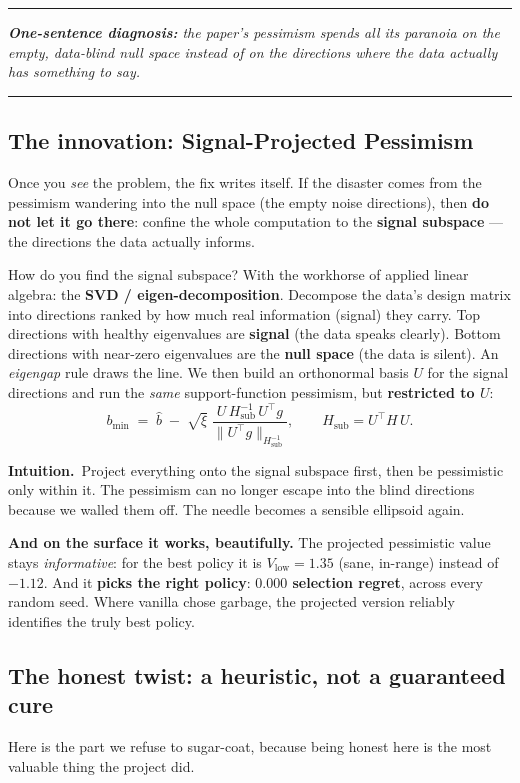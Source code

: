 \documentclass[11pt]{article}
\newenvironment{takeaway}
  {\par\vspace{4pt}\noindent\begin{center}\begin{minipage}{0.94\linewidth}%
   \color{black!88}\rule{\linewidth}{0.7pt}\par\vspace{3pt}\small\itshape}
  {\par\vspace{3pt}\rule{\linewidth}{0.7pt}\end{minipage}\end{center}\vspace{4pt}}
\newcommand{\intuition}[1]{\vspace{2pt}\noindent\textbf{Intuition.}\ #1\par\vspace{2pt}}
\begin{document}
\begin{takeaway}
\textbf{One-sentence diagnosis:} the paper's pessimism spends all its paranoia on the
empty, data-blind \emph{null space} instead of on the directions where the data
actually has something to say.
\end{takeaway}

\subsection{The innovation: Signal-Projected Pessimism}
Once you \emph{see} the problem, the fix writes itself. If the disaster comes from the
pessimism wandering into the null space (the empty noise directions), then
\textbf{do not let it go there}: confine the whole computation to the \textbf{signal
subspace} --- the directions the data actually informs.

How do you find the signal subspace? With the workhorse of applied linear algebra:
the \textbf{SVD / eigen-decomposition}. Decompose the data's design matrix into
directions ranked by how much real information (signal) they carry. Top directions
with healthy eigenvalues are \textbf{signal} (the data speaks clearly). Bottom
directions with near-zero eigenvalues are the \textbf{null space} (the data is
silent). An \emph{eigengap} rule draws the line. We then build an orthonormal basis
$U$ for the signal directions and run the \emph{same} support-function pessimism, but
\textbf{restricted to $U$}:
\begin{equation}
b_{\min} \;=\; \hat b \;-\; \sqrt{\xi}\;\frac{U\,H_{\mathrm{sub}}^{-1}\,U^\top g}
{\lVert U^\top g\rVert_{H_{\mathrm{sub}}^{-1}}},
\qquad H_{\mathrm{sub}} = U^\top H\,U.
\end{equation}

\intuition{Project everything onto the signal subspace first, then be pessimistic
only within it. The pessimism can no longer escape into the blind directions because
we walled them off. The needle becomes a sensible ellipsoid again.}

\textbf{And on the surface it works, beautifully.} The projected pessimistic value
stays \emph{informative}: for the best policy it is $V_{\text{low}}=1.35$ (sane,
in-range) instead of $-1.12$. And it \textbf{picks the right policy}:
\textbf{$0.000$ selection regret}, across every random seed. Where vanilla chose
garbage, the projected version reliably identifies the truly best policy.

\subsection{The honest twist: a heuristic, not a guaranteed cure}
Here is the part we refuse to sugar-coat, because being honest here is the most
valuable thing the project did.
\end{document}
